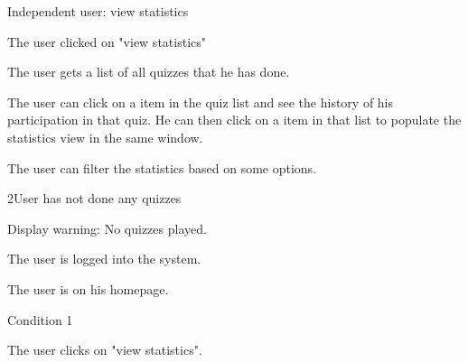 

\begin{uc}{Independent user: view statistics}

    \begin{uc-mss}
    \item The user clicked on "view statistics"
    \item The user gets a list of all quizzes that he has done.
    \item The user can click on a item in the quiz list and see the history of his participation in that quiz. He can then click on a item in that list to populate the statistics view in the same window.
    \item The user can filter the statistics based on some options.
    \end{uc-mss}

    \begin{uc-ext}

        \begin{uc-fail}{2}{User has not done any quizzes}
        \item Display warning: No quizzes played.
        \end{uc-fail}

    \end{uc-ext}

    \begin{uc-pre}
    \item The user is logged into the system.
    \item The user is on his homepage.
    \end{uc-pre}

    \begin{uc-post}
    \item Condition 1
    \end{uc-post}

    \begin{uc-trig}
    \item The user clicks on "view statistics".
    \end{uc-trig}

\end{uc}